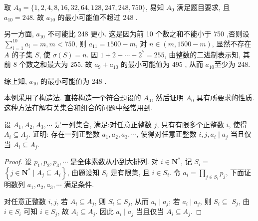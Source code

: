\begin{solution}
取 $A_{0}=\{1,2,4,8,16,32,64,128,247,248,750\}$, 易知 $A_{0}$ 满足题目要求, 且 $a_{10}=248$. 故 $a_{10}$ 的最小可能值不超过 248 .

另一方面, $a_{10}$ 不可能比 248 更小. 这是因为前 10 个数之和不能小于 750 ,否则设 $\sum_{i=1}^{10} a_{i}=m, m<750$, 则 $a_{11}=1500-m$, 对 $n \in(m, 1500-m)$, 显然不存在 $A$ 的子集 $S$, 使 $\sigma(S)=n$. 因 $1+2+\cdots+2^{7}=255$, 由整数的二进制表示知, 其前 8 个数之和最大为 255. 故 $a_{9}+a_{10}$ 的最小可能值为 495 , 从而 $a_{10}$至少为 248.

综上知, $a_{10}$ 的最小可能值为 248 .
\end{solution}

\begin{note}
本例采用了构造法. 直接构造一个符合题设的 $A_{0}$, 然后证明 $A_{0}$ 具有所要求的性质. 这种方法在解有关集合和组合的问题中经常用到.
\end{note}

\begin{example}
设 $A_{1}, A_{2}, A_{3}, \cdots$ 是一列集合, 满足:对任意正整数 $j$, 只有有限多个正整数 $i$, 使得 $A_{i} \subseteq A_{j}$. 证明: 存在一列正整数 $a_{1}, a_{2}, a_{3}, \cdots$, 使得对任意正整数 $i ,  j, a_{i} \mid a_{j}$ 当且仅当 $A_{i} \subseteq A_{j}$.
\end{example}
\begin{proof}
设 $p_{1}, p_{2}, p_{3}, \cdots$ 是全体素数从小到大排列. 对 $i \in \mathbf{N}^{*}$, 记 $S_{i}=$ $\left\{j \in \mathbf{N}^{*} \mid A_{j} \subseteq A_{i}\right\}$, 由题设知 $S_{i}$ 是有限集, 且 $i \in S_{i}$. 令 $a_{i}=\prod_{j \in S_{i}} p_{j}$, 下面证明数列 $a_{1}, a_{2}, a_{3}, \cdots$ 满足条件.

对任意正整数 $i ,  j$, 若 $A_{i} \subseteq A_{j}$, 则 $S_{i} \subseteq S_{j}$, 从而 $a_{i} \mid a_{j}$; 若 $a_{i} \mid a_{j}$, 则 $S_{i} \subseteq$ $S_{j}$, 由 $i \in S_{i}$ 可知 $i \in S_{j}$, 故 $A_{i} \subseteq A_{j}$. 因此 $a_{i} \mid a_{j}$ 当且仅当 $A_{i} \subseteq A_{j}$.
\end{proof}


